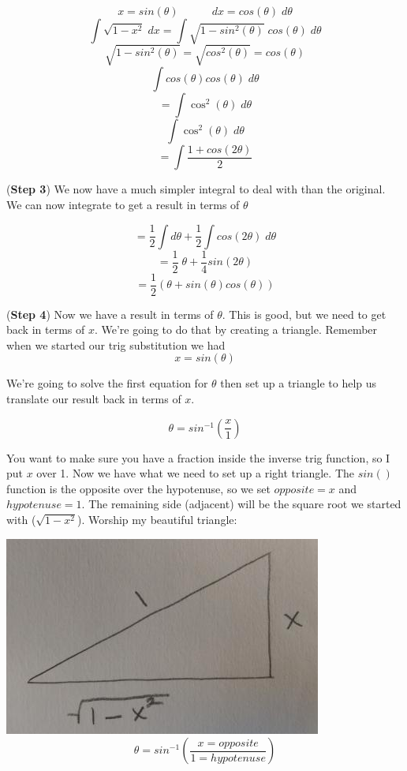 \documentclass[12pt]{report}
\begin{document}
$$ x = sin(\theta) \quad \quad \quad dx = cos(\theta) \; d\theta $$
$$ \int \sqrt{1-x^2} \; dx = \int \sqrt{1-sin^2(\theta)} \; cos(\theta) \; d\theta $$
$$ \sqrt{1-sin^2(\theta)} = \sqrt{cos^2(\theta)} = cos(\theta) $$
$$ \int cos(\theta) cos(\theta) \; d\theta $$
$$ = \int \cos^2(\theta) \; d\theta $$
$$ \int \cos^2(\theta) \; d\theta $$
$$ = \int \frac{1 + cos(2\theta)}{2} $$

(\textbf{Step 3}) We now have a much simpler integral to deal with than the original. We can now integrate to get a result in terms of $\theta$


$$ = \frac{1}{2} \int d\theta + \frac{1}{2} \int cos(2\theta) \; d\theta $$
$$ = \frac{1}{2} \; \theta + \frac{1}{4} sin(2\theta) $$
$$ = \frac{1}{2} \left( \theta +  sin(\theta)cos(\theta) \right) $$

(\textbf{Step 4}) Now we have a result in terms of $\theta$. This is good, but we need to get back in terms of $x$. We're going to do that by creating a triangle.  Remember when we started our trig substitution we had
$$ x = sin(\theta) $$

We're going to solve the first equation for $\theta$ then set up a triangle to help us translate our result back in terms of $x$.

$$ \theta = sin^{-1} \left( \frac{x}{1} \right) $$

You want to make sure you have a fraction inside the inverse trig function, so I put $x$ over 1. Now we have what we need to set up a right triangle. The $sin()$ function is the opposite over the hypotenuse, so we set $ opposite = x $ and $ hypotenuse = 1 $. The remaining side (adjacent) will be the square root we started with ($\sqrt{1-x^2}$). Worship my beautiful triangle: \\

\begin{center}
\includegraphics[scale=0.6]{trig_sub_triangle}
$$ \theta = sin^{-1}\left( \frac{x = opposite}{1 = hypotenuse} \right) $$
\end{center}
\end{document}
